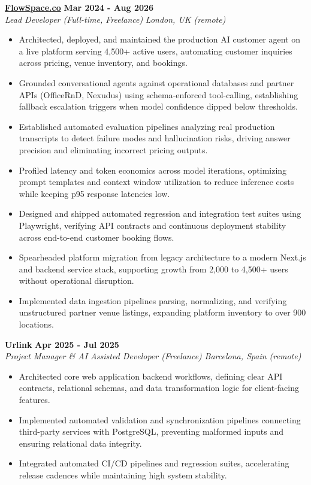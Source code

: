 \documentclass[10pt,a4paper]{article}
\newcommand{\role}[4]{%
  \textbf{#1} \hfill \textbf{#2}\\[1pt]%
  \textit{#3} \hfill \textit{#4}\\[2pt]%
}
\begin{document}
\role{\href{https://flowspace.co}{FlowSpace.co}}{Mar 2024 - Aug 2026}{Lead Developer (Full-time, Freelance)}{London, UK (remote)}
\begin{itemize}
  \item Architected, deployed, and maintained the production AI customer agent on a live platform serving 4,500+ active users, automating customer inquiries across pricing, venue inventory, and bookings.
  \item Grounded conversational agents against operational databases and partner APIs (OfficeRnD, Nexudus) using schema-enforced tool-calling, establishing fallback escalation triggers when model confidence dipped below thresholds.
  \item Established automated evaluation pipelines analyzing real production transcripts to detect failure modes and hallucination risks, driving answer precision and eliminating incorrect pricing outputs.
  \item Profiled latency and token economics across model iterations, optimizing prompt templates and context window utilization to reduce inference costs while keeping p95 response latencies low.
  \item Designed and shipped automated regression and integration test suites using Playwright, verifying API contracts and continuous deployment stability across end-to-end customer booking flows.
  \item Spearheaded platform migration from legacy architecture to a modern Next.js and backend service stack, supporting growth from 2,000 to 4,500+ users without operational disruption.
  \item Implemented data ingestion pipelines parsing, normalizing, and verifying unstructured partner venue listings, expanding platform inventory to over 900 locations.
\end{itemize}

\role{Urlink}{Apr 2025 - Jul 2025}{Project Manager \& AI Assisted Developer (Freelance)}{Barcelona, Spain (remote)}
\begin{itemize}
  \item Architected core web application backend workflows, defining clear API contracts, relational schemas, and data transformation logic for client-facing features.
  \item Implemented automated validation and synchronization pipelines connecting third-party services with PostgreSQL, preventing malformed inputs and ensuring relational data integrity.
  \item Integrated automated CI/CD pipelines and regression suites, accelerating release cadences while maintaining high system stability.
\end{itemize}
\end{document}
